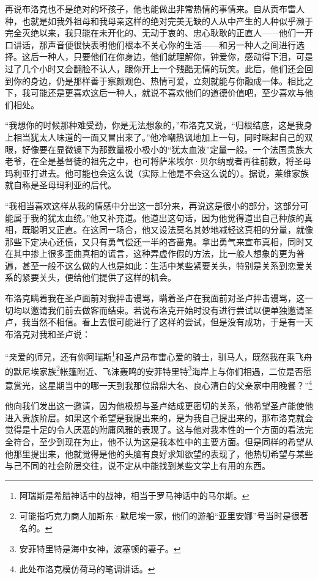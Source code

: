 \par 再说布洛克也不是绝对的坏孩子，他也能做出非常热情的事情来。自从贡布雷人种，也就是如我外祖母和我母亲这样的绝对完美无缺的人从中产生的人种似乎濒于完全灭绝以来，我只能在未开化的、无动于衷的、忠心耿耿的正直人——他们一开口讲话，那声音便很快表明他们根本不关心你的生活——和另一种人之间进行选择。这后一种人，只要他们在你身边，他们就理解你，钟爱你，感动得下泪，可是过了几个小时又会翻脸不认人，跟你开上一个残酷无情的玩笑。此后，他们还会回到你的身边，仍是那样善于察颜观色、热情可爱，立刻就能与你融成一体。相比之下，我可能还是更喜欢这后一种人，就说不喜欢他们的道德价值吧，至少喜欢与他们相处。
\par “我想你的时候那种难受劲，你是无法想象的，”布洛克又说，“归根结底，这是我身上相当犹太人味道的一面又冒出来了。”他冷嘲热讽地加上一句，同时眯起自己的双眼，好像要在显微镜下为那数量极小极小的“犹太血液”定量一般。一个法国贵族大老爷，在全是基督徒的祖先之中，也可将萨米埃尔·贝尔纳或者再往前数，将圣母玛利亚打进去。他可能也会这么说（实际上他是不会这么说的）。据说，莱维家族就自称是圣母玛利亚的后代。
\par “我相当喜欢这样从我的情感中分出这一部分来，再说这是很小的部分，这部分可能属于我的犹太血统。”他又补充道。他道出这句话，因为他觉得道出自己种族的真相，既聪明又正直。在这同一场合，他又设法莫名其妙地减轻这真相的分量，就像那些下定决心还债，又只有勇气偿还一半的吝啬鬼。拿出勇气来宣布真相，同时又在其中掺上很多歪曲真相的谎言，这种弄虚作假的方法，比一般人想象的更为普遍，甚至一般不这么做的人也是如此：生活中某些紧要关头，特别是关系到恋爱关系的紧要关头，便给他们提供了这样的机会。
\par 布洛克瞒着我在圣卢面前对我抨击谩骂，瞒着圣卢在我面前对圣卢抨击谩骂，这一切均以邀请我们前去做客而结束。若说布洛克开始时没有进行尝试以便单独邀请圣卢，我当然不相信。看上去很可能进行了这样的尝试，但是没有成功，于是有一天布洛克对我和圣卢说：
\par “亲爱的师兄，还有你阿瑞斯\footnote{阿瑞斯是希腊神话中的战神，相当于罗马神话中的马尔斯。}和圣卢昂布雷心爱的骑士，驯马人，既然我在乘飞舟的默尼埃家族\footnote{可能指巧克力商人加斯东·默尼埃一家，他们的游船“亚里安娜”号当时是很著名的。}帐篷附近、飞沫轰鸣的安菲特里特\footnote{安菲特里特是海中女神，波塞顿的妻子。}海岸上与你们相遇，二位是否愿意赏光，这星期当中的哪一天到我那位鼎鼎大名、良心清白的父亲家中用晚餐？”\footnote{此处布洛克模仿荷马的笔调讲话。}
\par 他向我们发出这一邀请，因为他极想与圣卢结成更密切的关系，他希望圣卢能使他进入贵族阶层。如果这个希望是我提出来的，是为我自己提出来的，那布洛克就会觉得是十足的令人厌恶的附庸风雅的表现了。这与他对我本性的一个方面的看法完全符合，至少到现在为止，他不认为这是我本性中的主要方面。但是同样的希望从他那里提出来，他就觉得是他的头脑有良好求知欲望的表现了，他热切希望与某些与己不同的社会阶层交往，说不定从中能找到某些文学上有用的东西。
